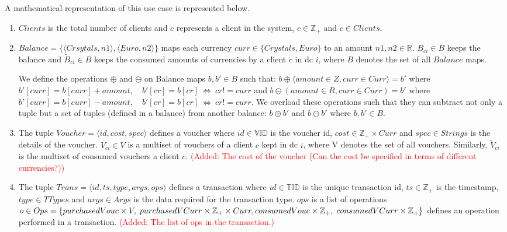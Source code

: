 A mathematical representation of this use case is represented below.
\begin{enumerate}

	\item $Clients$ is the total number of clients and $c$ represents a client in the system, $c \in \mathbb{Z}_{+}$ and $c \in Clients$.

	\item $Balance = \{ \langle Crsytals, n1 \rangle, \langle Euro, n2 \rangle \}$ maps each currency $curr \in \{Crystals, Euro\}$ to an amount $n1, n2 \in \mathbb{R}$. $B_{ci} \in B$ keeps the balance and $\widetilde{B}_{ci} \in B$ keeps the consumed amounts of currencies by a client $c$ in \gls{dc} $i$, where $B$ denotes the set of all $Balance$ maps.

	We define the operations $\oplus$ and $\ominus$ on Balance maps $b, b' \in B$ such that: $b \oplus \langle amount \in Z, curr \in Curr \rangle = b'$ where $b'[curr] = b[curr] + amount$,  ~  $b'[cr] = b[cr]  ~ \iff  ~  cr != curr$ and $b \ominus(amount \in R, curr \in Curr) = b'$ where $b'[curr] = b[curr] - amount$,  ~  $b'[cr] = b[cr]  ~  \iff  ~  cr != curr$. We overload these operations such that they can subtract not only a tuple but a set of tuples (defined in a balance) from another balance: $b \oplus b'$ and $b \ominus b'$ where $b, b' \in B$.  
	
	\item The tuple $Voucher = \langle id, cost, spec \rangle$ defines a voucher where $id \in \mathbb{VID}$  is the voucher \gls{id}, $cost \in \mathbb{Z}_{+} \times Curr$ and $spec \in Strings$ is the details of the voucher. $V_{ci} \in V$ is a multiset of vouchers of a client $c$ kept in \gls{dc} $i$, where V denotes the set of all vouchers. Similarly, $\widetilde{V}_{ci}$ is the multiset of consumed vouchers a client $c$.
	\textcolor{red}{(Added: The cost of the voucher (Can the cost be specified in terms of different currencies?))}
	
	\item The tuple $Trans = \langle id, ts, type, args, ops \rangle$ defines a transaction where $id \in \mathbb{TID}$ is the unique transaction \gls{id}, $ts \in \mathbb{Z}_{+}$ is the timestamp, $type \in TTypes$ and $args \in Args$ is the data required for the transaction type.  $ops$ is a list of operations $o \in Ops = \{ purchasedVouc \times V, \; purchasedVCurr \times \mathbb{Z}_{+} \times Curr, \\ consumedVouc \times \mathbb{Z}_{+}, \; consumedVCurr \times \mathbb{Z}_{+} \}$ defines an operation performed in a transaction. \textcolor{red}{(Added: The list of ops in the transaction.)}
 	

\end{enumerate}
